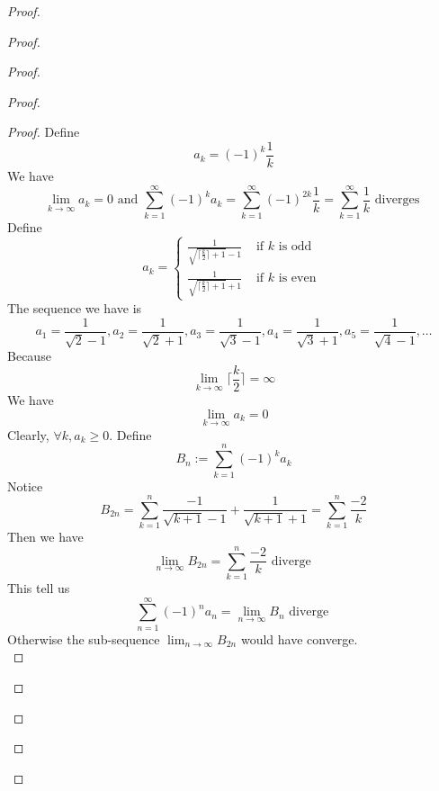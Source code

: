 \documentclass{report}
\begin{document}
\begin{proof}
\begin{proof}
\begin{proof}
\begin{proof}
\begin{proof}
Define
\begin{equation}
a_k=(-1)^k \frac{1}{k}
\end{equation}
We have
\begin{equation}
\lim_{k\to\infty}a_k=0\text{ and }\sum_{k=1}^\infty (-1)^k a_k=\sum_{k=1}^\infty (-1)^{2k}\frac{1}{k}=\sum_{k=1}^\infty \frac{1}{k}\text{ diverges }
\end{equation}
Define
\begin{equation}
a_k=\begin{cases}
\frac{1}{\sqrt{\lceil \frac{k}{2} \rceil +1}-1}& \text{ if $k$ is odd }\\
\frac{1}{\sqrt{\lceil \frac{k}{2} \rceil +1}+1 }& \text{ if $k$ is even }
\end{cases}
\end{equation}
The sequence we have is
\begin{equation}
a_1=\frac{1}{\sqrt{2} -1},a_2=\frac{1}{\sqrt{2} +1},a_3=\frac{1}{\sqrt{3} -1},a_4=\frac{1}{\sqrt{3} +1},a_5=\frac{1}{\sqrt{4} -1},\dots
\end{equation}
Because 
\begin{equation}
\lim_{k\to\infty} \lceil \frac{k}{2}\rceil =\infty
\end{equation}
We have
\begin{equation}
\lim_{k\to\infty} a_k=0
\end{equation}
Clearly, $\forall k,a_k\geq 0$. Define
\begin{equation}
B_n:=\sum_{k=1}^n (-1)^k a_k
\end{equation}
Notice
\begin{equation}
B_{2n}=\sum_{k=1}^n \frac{-1}{\sqrt{k+1}-1}+\frac{1}{\sqrt{k+1} +1}=\sum_{k=1}^n \frac{-2}{k}
\end{equation}
Then we have
\begin{equation}
\lim_{n\to\infty}B_{2n}=\sum_{k=1}^n \frac{-2}{k}\text{ diverge }
\end{equation}
This tell us
\begin{equation}
\sum_{n=1}^\infty (-1)^n a_n=\lim_{n\to\infty}B_{n}\text{ diverge }
\end{equation}
Otherwise the sub-sequence $\lim_{n\to\infty}B_{2n}$ would have converge.\\


\end{proof}
\end{proof}
\end{proof}
\end{proof}
\end{proof}
\end{document}
